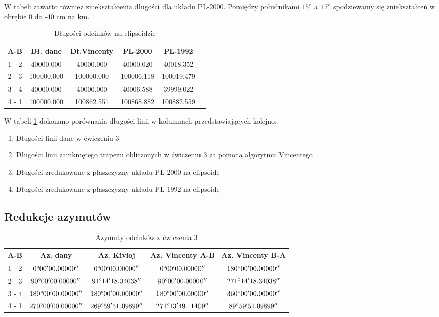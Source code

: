 \documentclass[fleqn,10pt,a4paper]{article}
\begin{document}
W tabeli zawarto również zniekształcenia długości dla układu PL-2000.
Pomiędzy południkami $15\degree$ a $17 \degree$ spodziewamy się zniekształceń w obrębie 0 do -40 cm na km.

\begin{table}[!ht]
  \centering
  \begin{tabular}{|c|c|c|c|c|c|}
    \hline
    A-B & Dł. dane & Dł.Vincenty & PL-2000 & PL-1992 \\
    \hline
    1 - 2 & 40000.000 & 40000.000 & 40000.020 & 40018.352 \\
    2 - 3 & 100000.000 & 100000.000 & 100006.118 & 100019.479 \\
    3 - 4 & 40000.000 & 40000.000 & 40006.588 & 39999.022 \\
    4 - 1 & 100000.000 & 100862.551 & 100868.882 & 100882.559 \\
    \hline
  \end{tabular}
  \caption{Długości odcinków na elipsoidzie}
  \label{tab:dl}
\end{table}

W tabeli \ref{tab:dl} dokonano porównania długości linii w kolumnach przedstawiających kolejno:
\begin{enumerate}
  \item Długości linii dane w ćwiczeniu 3
  \item Długości linii zamkniętego trapezu obliczonych w ćwiczeniu 3 za pomocą algorytmu Vincentego 
  \item Długości zredukowane z płaszczyzny układu PL-2000 na elipsoidę
  \item Długości zredukowane z płaszczyzny układu PL-1992 na elipsoidę
\end{enumerate}


\subsection{Redukcje azymutów}

\begin{table}[!ht]
  \centering
  \begin{tabular}{|c|c|c|c|c|}
    \hline
    A-B    & Az. dany    &Az. Kivioj        & Az. Vincenty  A-B          & Az. Vincenty B-A \\
    \hline
    1 - 2 & $  0\degree 00' 00.00000''$ & $  0\degree 00' 00.00000''$  & $  0\degree 00' 00.00000''$ & $180\degree 00' 00.00000''$ \\
    2 - 3 & $ 90\degree 00' 00.00000''$ & $ 91\degree 14' 18.34038''$  & $ 90\degree 00' 00.00000''$ & $271\degree 14' 18.34038''$ \\
    3 - 4 & $180\degree 00' 00.00000''$ & $ 180\degree 00' 00.00000''$ & $180\degree 00' 00.00000''$  & $360\degree 00' 00.00000''$ \\
    4 - 1 & $270\degree 00' 00.00000''$ & $ 269\degree 59' 51.09899''$ & $271\degree 13'49.11409''$   & $ 89\degree 59' 51.09899''$ \\
    \hline
  \end{tabular}
  \caption{Azymuty odcinków z ćwiczenia 3}
  \label{tab:az3}
\end{table}
\end{document}
